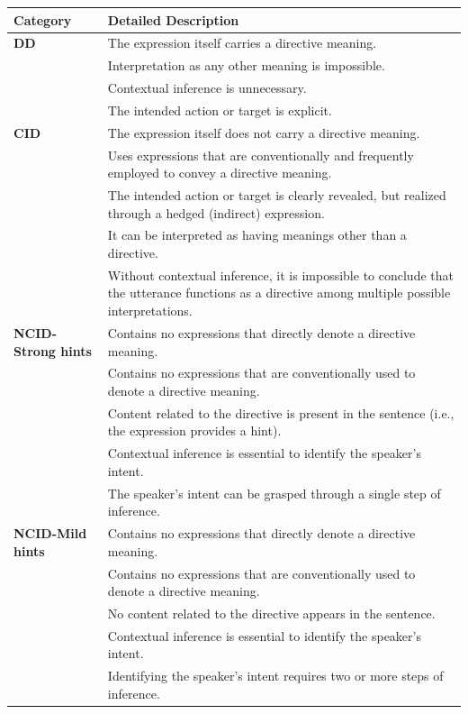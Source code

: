\documentclass[11pt]{article}
\begin{document}
\begin{table}[h]
\centering
\begin{tabularx}{\textwidth}{l X}
\toprule
\textbf{Category} & \textbf{Detailed Description} \\
\midrule

\textbf{DD} & The expression itself carries a directive meaning. \\
            & Interpretation as any other meaning is impossible. \\
            & Contextual inference is unnecessary. \\
            & The intended action or target is explicit. \\

\midrule

\textbf{CID} & The expression itself does not carry a directive meaning. \\
             & Uses expressions that are conventionally and frequently employed to convey a directive meaning. \\
             & The intended action or target is clearly revealed, but realized through a hedged (indirect) expression. \\
             & It can be interpreted as having meanings other than a directive. \\
             & Without contextual inference, it is impossible to conclude that the utterance functions as a directive among multiple possible interpretations. \\

\midrule

\textbf{NCID-Strong hints} & Contains no expressions that directly denote a directive meaning. \\
                          & Contains no expressions that are conventionally used to denote a directive meaning. \\
                          & Content related to the directive is present in the sentence (i.e., the expression provides a hint). \\
                          & Contextual inference is essential to identify the speaker's intent. \\
                          & The speaker's intent can be grasped through a single step of inference. \\

\midrule

\textbf{NCID-Mild hints} & Contains no expressions that directly denote a directive meaning. \\
                        & Contains no expressions that are conventionally used to denote a directive meaning. \\
                        & No content related to the directive appears in the sentence. \\
                        & Contextual inference is essential to identify the speaker's intent. \\
                        & Identifying the speaker's intent requires two or more steps of inference. \\


\end{tabularx}
\end{table}
\end{document}
